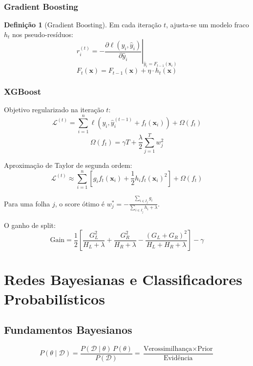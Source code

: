\documentclass[12pt,a4paper,twoside]{book}
\theoremstyle{definition}
\newtheorem{definicao}{Definição}[chapter]
\theoremstyle{remark}
\newcommand{\D}{\mathcal{D}}
\newcommand{\bx}{\bm{x}}
\begin{document}
\subsection{Gradient Boosting}

\begin{definicao}[Gradient Boosting]
Em cada iteração $t$, ajusta-se um modelo fraco $h_t$ nos pseudo-resíduos:
\[
r_i^{(t)} = -\left.\frac{\partial \ell(y_i, \hat{y}_i)}{\partial \hat{y}_i}\right|_{\hat{y}_i = F_{t-1}(\bx_i)}
\]
\[
F_t(\bx) = F_{t-1}(\bx) + \eta \cdot h_t(\bx)
\]
\end{definicao}

\subsection{XGBoost}

Objetivo regularizado na iteração $t$:
\[
\mathcal{L}^{(t)} = \sum_{i=1}^n \ell(y_i, \hat{y}_i^{(t-1)} + f_t(\bx_i)) + \Omega(f_t)
\]
\[
\Omega(f_t) = \gamma T + \frac{\lambda}{2}\sum_{j=1}^T w_j^2
\]

Aproximação de Taylor de segunda ordem:
\[
\mathcal{L}^{(t)} \approx \sum_{i=1}^n \left[g_i f_t(\bx_i) + \frac{1}{2}h_i f_t(\bx_i)^2\right] + \Omega(f_t)
\]

Para uma folha $j$, o score ótimo é $w_j^* = -\frac{\sum_{i \in I_j} g_i}{\sum_{i \in I_j} h_i + \lambda}$.

O ganho de split:
\[
\text{Gain} = \frac{1}{2}\left[\frac{G_L^2}{H_L+\lambda} + \frac{G_R^2}{H_R+\lambda} - \frac{(G_L+G_R)^2}{H_L+H_R+\lambda}\right] - \gamma
\]

\chapter{Redes Bayesianas e Classificadores Probabilísticos}

\section{Fundamentos Bayesianos}

\begin{tcolorbox}[teobox,title=Teorema de Bayes]
\[
P(\theta \mid \D) = \frac{P(\D \mid \theta)\, P(\theta)}{P(\D)} = \frac{\text{Verossimilhança} \times \text{Prior}}{\text{Evidência}}
\]
\end{tcolorbox}
\end{document}
